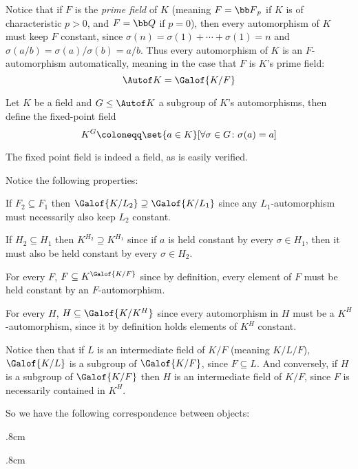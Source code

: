 Notice that if $F$ is the {\it prime field} of $K$ (meaning $F={\bb F}_p$ if $K$ is of characteristic $p>0$, and $F={\bb Q}$ if $p=0$), then every automorphism of $K$ must keep $F$ constant, since
$\sigma(n)=\sigma(1)+\cdots+\sigma(1)=n$ and $\sigma(a/b)=\sigma(a)/\sigma(b)=a/b$.
Thus every automorphism of $K$ is an $F$-automorphism automatically, meaning in the case that $F$ is $K$'s prime field:
$$ \Autof K = \Galof{K/F} $$

\bdefn

    Let $K$ be a field and $G\leq\Autof K$ a subgroup of $K$'s automorphisms, then define the {\emphcolor fixed-point field}
    $$ K^G \coloneqq \set{a\in K}[\forall\sigma\in G\colon\sigma(a)=a] $$

\edefn

The fixed point field is indeed a field, as is easily verified.

Notice the following properties:
\benum
    \item If $F_2\subseteq F_1$ then $\Galof{K/L_2}\supseteq\Galof{K/L_1}$ since any $L_1$-automorphism must necessarily also keep $L_2$ constant.
    \item If $H_2\subseteq H_1$ then $K^{H_2}\supseteq K^{H_1}$ since if $a$ is held constant by every $\sigma\in H_1$, then it must also be held constant by every $\sigma\in H_2$.
    \item For every $F$, $F\subseteq K^{\Galof{K/F}}$ since by definition, every element of $F$ must be held constant by an $F$-automorphism.
    \item For every $H$, $H\subseteq\Galof{K/K^H}$ since every automorphism in $H$ must be a $K^H$-automorphism, since it by definition holds elements of $K^H$ constant.
\eenum

Notice then that if $L$ is an intermediate field of $K/F$ (meaning $K/L/F$), $\Galof{K/L}$ is a subgroup of $\Galof{K/F}$, since $F\subseteq L$.
And conversely, if $H$ is a subgroup of $\Galof{K/F}$ then $H$ is an intermediate field of $K/F$, since $F$ is necessarily contained in $K^H$.

So we have the following correspondence between objects:

\kern.8cm
\centerline{}
\kern.8cm

